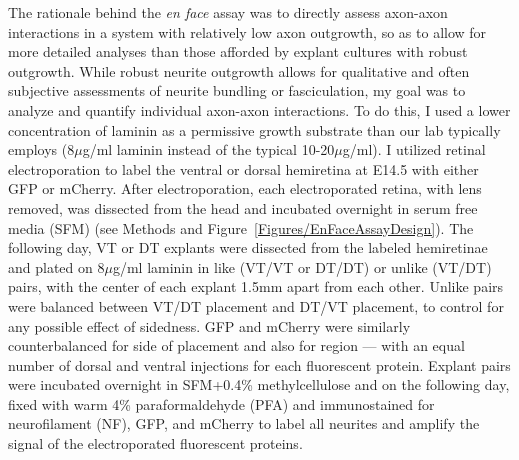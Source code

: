 \label{sec:EnFace}
The rationale behind the \emph{en face} assay was to directly assess axon-axon interactions in a system with relatively low axon outgrowth, so as to allow for more detailed analyses than those afforded by explant cultures with robust outgrowth.
While robust neurite outgrowth allows for qualitative and often subjective assessments of neurite bundling or fasciculation, my goal was to analyze and quantify individual axon-axon interactions.
To do this, I used a lower concentration of laminin as a permissive growth substrate than our lab typically employs (8$\mu$g/ml laminin instead of the typical 10-20$\mu$g/ml).
I utilized \emph{\exvivo{}} retinal electroporation \cite{petros2009utero} to label the ventral or dorsal hemiretina at E14.5 with either GFP or mCherry.
After electroporation, each electroporated retina, with lens removed, was dissected from the head and incubated overnight in serum free media (SFM) (see Methods and Figure~\ref{Figures/EnFaceAssayDesign}).
The following day, VT or DT explants were dissected from the labeled hemiretinae and plated on 8$\mu$g/ml laminin in like (VT/VT or DT/DT) or unlike (VT/DT) pairs, with the center of each explant 1.5mm apart from each other.
Unlike pairs were balanced between VT/DT placement and DT/VT placement, to control for any possible effect of sidedness.
GFP and mCherry were similarly counterbalanced for side of placement and also for region --- with an equal number of dorsal and ventral injections for each fluorescent protein.
Explant pairs were incubated overnight in SFM+0.4\% methylcellulose and on the following day, fixed with warm 4\% paraformaldehyde (PFA) and immunostained for neurofilament (NF), GFP, and mCherry to label all neurites and amplify the signal of the electroporated fluorescent proteins.

